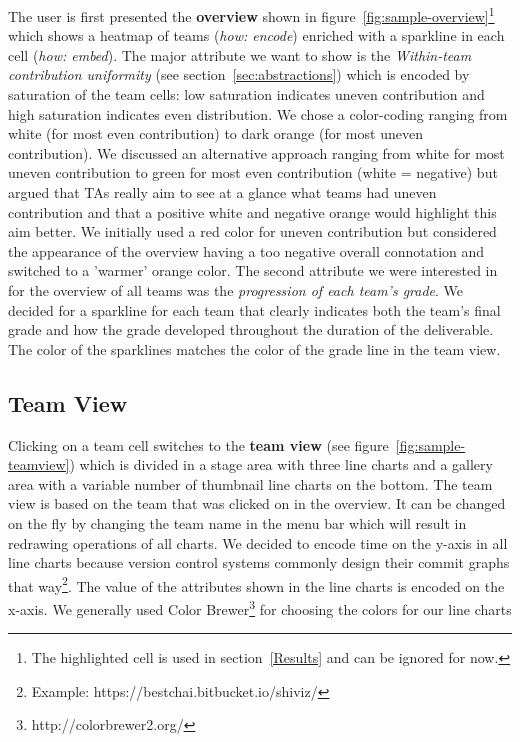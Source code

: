 \documentclass[../manifest.tex]{subfiles}
\begin{document}
The user is first presented the \textbf{overview} shown in figure~\ref{fig:sample-overview}\footnote{The highlighted cell is used in section~\ref{Results} and can be ignored for now.} which shows a heatmap of teams (\textit{how: encode}) enriched with a sparkline in each cell (\textit{how: embed}). The major attribute we want to show is the \textit{Within-team contribution uniformity} (see section~\ref{sec:abstractions}) which is encoded by saturation of the team cells: low saturation indicates uneven contribution and high saturation indicates even distribution. We chose a color-coding ranging from white (for most even contribution) to dark orange (for most uneven contribution). We discussed an alternative approach ranging from white for most uneven contribution to green for most even contribution (white = negative) but argued that TAs really aim to see at a glance what teams had uneven contribution and that a positive white and negative orange would highlight this aim better. We initially used a red color for uneven contribution but considered the appearance of the overview having a too negative overall connotation and switched to a 'warmer' orange color. The second attribute we were interested in for the overview of all teams was the \textit{progression of each team's grade}. We decided for a sparkline for each team that clearly indicates both the team's final grade and how the grade developed throughout the duration of the deliverable. The color of the sparklines matches the color of the grade line in the team view.

\subsection{Team View}

Clicking on a team cell switches to the \textbf{team view} (see figure~\ref{fig:sample-teamview}) which is divided in a stage area with three line charts and a gallery area with a variable number of thumbnail line charts on the bottom. The team view is based on the team that was clicked on in the overview. It can be changed on the fly by changing the team name in the menu bar which will result in redrawing operations of all charts. We decided to encode time on the y-axis in all line charts because version control systems commonly design their commit graphs that way\footnote{Example: https://bestchai.bitbucket.io/shiviz/}. The value of the attributes shown in the line charts is encoded on the x-axis. We generally used Color Brewer\footnote{http://colorbrewer2.org/} for choosing the colors for our line charts
\end{document}
